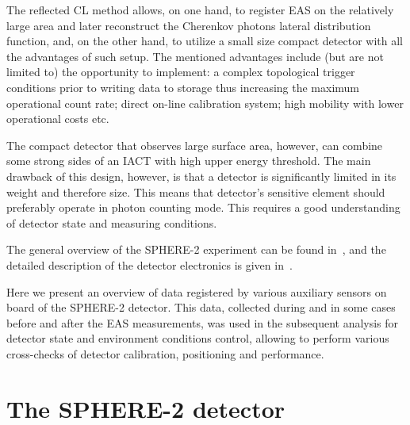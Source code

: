 \documentclass[final,5p,times,twocolumn]{elsarticle}
\begin{document}
The reflected CL method allows, on one hand, to register EAS on the relatively large area and later reconstruct the Cherenkov photons lateral distribution function, and, on the other hand, to utilize a small size compact detector with all the advantages of such setup. The mentioned advantages include (but are not limited to) the opportunity to implement: a complex topological trigger conditions prior to writing data to storage thus increasing the maximum operational count rate; direct on-line calibration system; high mobility with lower operational costs etc.

The compact detector that observes large surface area, however, can combine some strong sides of an IACT with high upper energy threshold. The main drawback of this design, however, is that a detector is significantly limited in its weight and therefore size. This means that detector's sensitive element should preferably operate in photon counting mode. This requires a good understanding of detector state and measuring conditions.

The general overview of the SPHERE-2 experiment can be found in~\cite{Ant15a}, and the detailed description of the detector electronics is given in~\cite{Ant20}. 

Here we present an overview of data registered by various auxiliary sensors on board of the SPHERE-2 detector. This data, collected during and in some cases before and after the EAS measurements, was used in the subsequent analysis for detector state and environment conditions control, allowing to perform various cross-checks of detector calibration, positioning and performance.

\section{The SPHERE-2 detector \label{sect:detector}}
\end{document}

